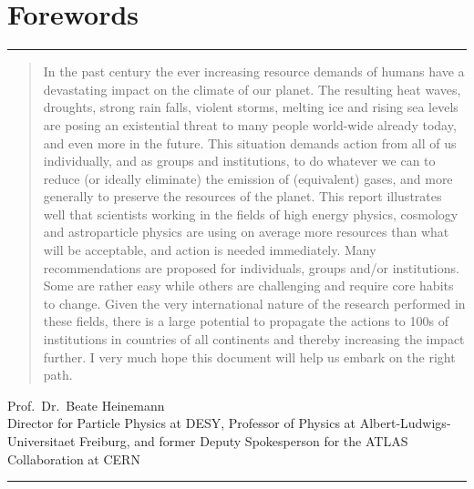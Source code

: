 \documentclass[../SustainableHEP.tex]{subfiles}
\begin{document}
\RaggedRight
\sloppy
\newpage

\section*{Forewords}
\label{sec:Forewords}

\textcolor{Pythongreen}{\rule{2cm}{3pt}}

\begin{quotation}
In the past century the ever increasing resource demands of humans have a devastating impact on the climate of our planet. The resulting heat waves, droughts, strong rain falls, violent storms, melting ice and rising sea levels are posing an existential threat to many people world-wide already today, and even more in the future. This situation demands action from all of us individually, and as groups and institutions, to do whatever we can to reduce (or ideally eliminate) the emission of \CdO  (equivalent) gases, and more generally to preserve the resources of the planet. This report illustrates well that scientists working in the fields of high energy physics, cosmology and astroparticle physics are using on average more resources than what will be acceptable, and action is needed immediately. Many recommendations are proposed for individuals, groups and/or institutions. Some are rather easy while others are challenging and require core habits to change. Given the very international nature of the research performed in these fields, there is a large potential to propagate the actions to 100s of institutions in countries of all continents and thereby increasing the impact further. I very much hope this document will help us embark on the right path.
\end{quotation}
\begin{flushleft}
Prof.~Dr.~Beate Heinemann\\
Director for Particle Physics at DESY, Professor of Physics at Albert-Ludwigs-Universitaet Freiburg, and former Deputy Spokesperson for the ATLAS Collaboration at CERN
\end{flushleft}

\textcolor{Pythongreen}{\rule{2cm}{3pt}}
\end{document}
